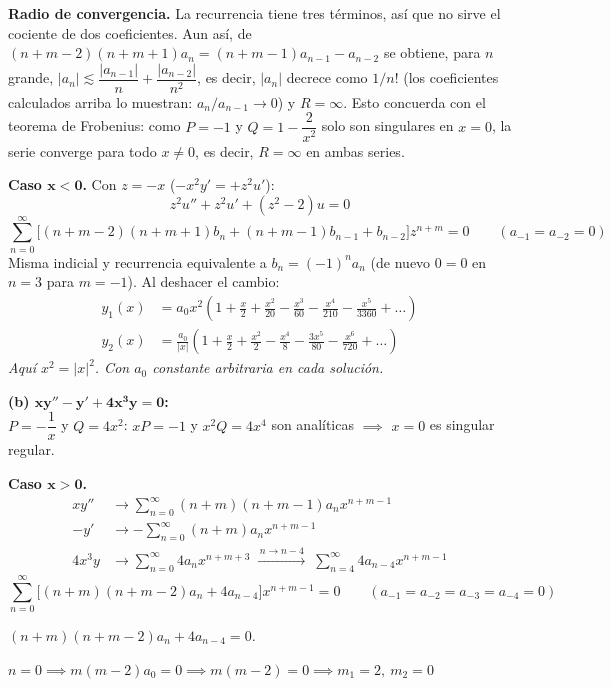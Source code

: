\documentclass[11pt, a4paper]{article}
\begin{document}
\smallskip\noindent\textbf{Radio de convergencia.} La recurrencia tiene tres términos, así que no sirve el cociente de dos coeficientes. Aun así, de $(n+m-2)(n+m+1)a_n=(n+m-1)a_{n-1}-a_{n-2}$ se obtiene, para $n$ grande, $|a_n|\lesssim\dfrac{|a_{n-1}|}{n}+\dfrac{|a_{n-2}|}{n^2}$, es decir, $|a_n|$ decrece como $1/n!$ (los coeficientes calculados arriba lo muestran: $a_n/a_{n-1}\to0$) y $R=\infty$. Esto concuerda con el teorema de Frobenius: como $P=-1$ y $Q=1-\dfrac{2}{x^2}$ solo son singulares en $x=0$, la serie converge para todo $x\neq0$, es decir, $R=\infty$ en ambas series.

\vspace{0.2cm}\noindent\textbf{Caso $\bm{x<0}$.} Con $z=-x$ ($-x^2y'=+z^2u'$):
\[
z^2u''+z^2u'+(z^2-2)u=0
\]
\[
\sum_{n=0}^\infty\Big[(n+m-2)(n+m+1)b_n+(n+m-1)b_{n-1}+b_{n-2}\Big]z^{n+m}=0 \qquad (a_{-1}=a_{-2}=0)
\]
Misma indicial y recurrencia equivalente a $b_n=(-1)^na_n$ (de nuevo $0=0$ en $n=3$ para $m=-1$). Al deshacer el cambio:
\[
\boxed{\begin{aligned}y_1(x)&=a_0x^2\left(1+\frac{x}{2}+\frac{x^2}{20}-\frac{x^3}{60}-\frac{x^4}{210}-\frac{x^5}{3360}+\dots\right) \\[2pt] y_2(x)&=\frac{a_0}{|x|}\left(1+\frac{x}{2}+\frac{x^2}{2}-\frac{x^4}{8}-\frac{3x^5}{80}-\frac{x^6}{720}+\dots\right)\end{aligned}}
\]
\textit{Aquí $x^2=|x|^2$. Con $a_0$ constante arbitraria en cada solución.}

\medskip
\noindent\textbf{(b) $\bm{xy''-y'+4x^3y=0}$:} \\
$P=-\dfrac1x$ y $Q=4x^2$: $xP=-1$ y $x^2Q=4x^4$ son analíticas $\implies$ $x=0$ es singular regular.

\vspace{0.2cm}\noindent\textbf{Caso $\bm{x>0}$.}
\begin{align*}
xy'' &\to \sum_{n=0}^\infty (n+m)(n+m-1)a_nx^{n+m-1} \\
-y' &\to -\sum_{n=0}^\infty (n+m)a_nx^{n+m-1} \\
4x^3y &\to \sum_{n=0}^\infty 4a_nx^{n+m+3} \;\xrightarrow{\,n\to n-4\,}\; \sum_{n=4}^\infty 4a_{n-4}x^{n+m-1}
\end{align*}
\[
\sum_{n=0}^\infty\Big[(n+m)(n+m-2)a_n+4a_{n-4}\Big]x^{n+m-1}=0 \qquad (a_{-1}=a_{-2}=a_{-3}=a_{-4}=0)
\]

\smallskip\noindent $(n+m)(n+m-2)a_n+4a_{n-4}=0$.

\smallskip\noindent $n=0 \implies m(m-2)a_0=0 \implies m(m-2)=0 \implies m_1=2,\ m_2=0$
\end{document}
